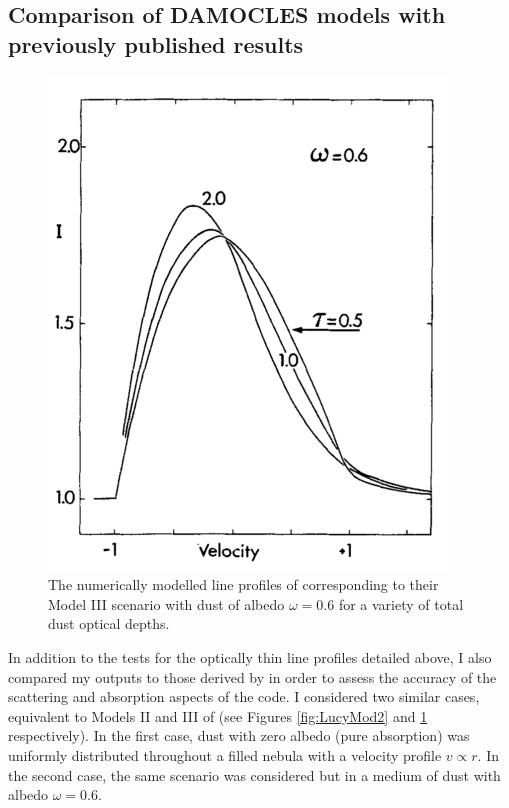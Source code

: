 \subsection{Comparison of DAMOCLES models with previously published results}
\label{opt_thick_testing}
\begin{figure}
\centering
\includegraphics[trim =0 0 0 0,clip=true,scale=0.6]{chapters/chapter4/images/Lucy89_Model3.png}
\caption{The numerically modelled line profiles of \citep{Lucy1989} corresponding to their Model III scenario with dust of albedo $\omega=0.6$ for a variety of total dust optical depths.}
\label{fig:LucyMod3}
\end{figure}



In addition to the tests for the optically thin line profiles detailed above, I also compared my outputs to those derived by \citet{Lucy1989} in order to assess the accuracy of the scattering and absorption aspects of the code.  
I  considered two similar cases, equivalent to Models II and III of 
\citet{Lucy1989} (see Figures \ref{fig:LucyMod2} and \ref{fig:LucyMod3} respectively). In the first case, dust with zero albedo (pure absorption) was 
uniformly distributed throughout a filled nebula with a velocity profile 
$v \propto r$.  In the second case, the same scenario was considered but in a 
medium of dust with albedo $\omega =0.6$.

